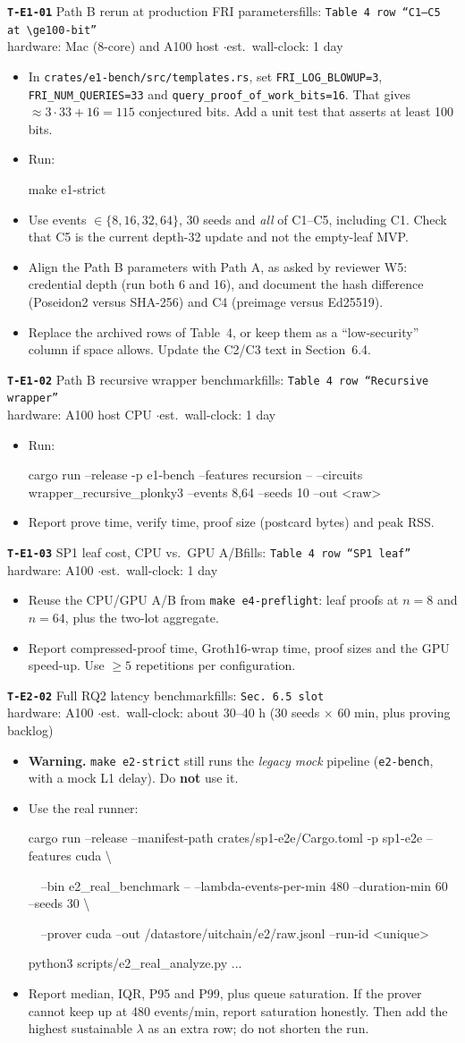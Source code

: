 \documentclass[10pt,a4paper]{article}
\newcommand{\task}[6]{%
\par\medskip\noindent\colorbox{blue!8}{\parbox{\dimexpr\linewidth-2\fboxsep}{%
\textbf{\texttt{#1}} \enspace #2\hfill{\small fills: \texttt{#3}}\\
{\small hardware: #4 \quad$\cdot$\quad est.\ wall-clock: #5}}}\par
\begin{itemize}#6\end{itemize}}
\newcommand{\cmd}[1]{\par\noindent\hspace*{1em}\begin{minipage}[t]{\dimexpr\linewidth-1em}\raggedright\small\ttfamily #1\end{minipage}\par}
\begin{document}
\task{T-E1-01}{Path B rerun at production FRI parameters}{Table~4 row ``C1--C5 at $\ge$100-bit''}{Mac (8-core) and A100 host}{1 day}{
\item In \texttt{crates/e1-bench/src/templates.rs}, set \texttt{FRI\_LOG\_BLOWUP=3}, \texttt{FRI\_NUM\_QUERIES=33} and \texttt{query\_proof\_of\_work\_bits=16}. That gives $\approx 3\cdot33+16=115$ conjectured bits. Add a unit test that asserts at least 100 bits.
\item Run:
\cmd{make e1-strict}
\item Use events $\in\{8,16,32,64\}$, 30 seeds and \emph{all} of C1--C5, including C1. Check that C5 is the current depth-32 update and not the empty-leaf MVP.
\item Align the Path B parameters with Path A, as asked by reviewer W5: credential depth (run both 6 and 16), and document the hash difference (Poseidon2 versus SHA-256) and C4 (preimage versus Ed25519).
\item Replace the archived rows of Table~4, or keep them as a ``low-security'' column if space allows. Update the C2/C3 text in Section~6.4.
}

\task{T-E1-02}{Path B recursive wrapper benchmark}{Table~4 row ``Recursive wrapper''}{A100 host CPU}{1 day}{
\item Run:
\cmd{cargo run --release -p e1-bench --features recursion -- --circuits wrapper\_recursive\_plonky3 --events 8,64 --seeds 10 --out <raw>}
\item Report prove time, verify time, proof size (postcard bytes) and peak RSS.
}

\task{T-E1-03}{SP1 leaf cost, CPU vs.\ GPU A/B}{Table~4 row ``SP1 leaf''}{A100}{1 day}{
\item Reuse the CPU/GPU A/B from \texttt{make e4-preflight}: leaf proofs at $n=8$ and $n=64$, plus the two-lot aggregate.
\item Report compressed-proof time, Groth16-wrap time, proof sizes and the GPU speed-up. Use $\ge5$ repetitions per configuration.
}

\task{T-E2-02}{Full RQ2 latency benchmark}{Sec.~6.5 slot}{A100}{about 30--40 h (30 seeds $\times$ 60 min, plus proving backlog)}{
\item \textbf{Warning.} \texttt{make e2-strict} still runs the \emph{legacy mock} pipeline (\texttt{e2-bench}, with a mock L1 delay). Do \textbf{not} use it.
\item Use the real runner:
\cmd{cargo run --release --manifest-path crates/sp1-e2e/Cargo.toml -p sp1-e2e --features cuda \textbackslash}
\cmd{\ \ --bin e2\_real\_benchmark -- --lambda-events-per-min 480 --duration-min 60 --seeds 30 \textbackslash}
\cmd{\ \ --prover cuda --out /datastore/uitchain/e2/raw.jsonl --run-id <unique>}
\cmd{python3 scripts/e2\_real\_analyze.py ...}
\item Report median, IQR, P95 and P99, plus queue saturation. If the prover cannot keep up at 480 events/min, report saturation honestly. Then add the highest sustainable $\lambda$ as an extra row; do not shorten the run.
}
\end{document}
